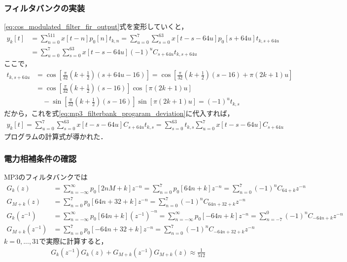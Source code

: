\documentclass[14pt,xcolor=dvipsnames,table,dvipdfmx]{beamer}
\begin{document}
\begin{frame}[c]
    \frametitle{フィルタバンクの実装}
    \scriptsize
    \eqref{eq:cos_modulated_filter_fir_output}式を変形していくと，
    \begin{align}
        y_{k}[t] &= \sum_{n = 0}^{511} x[t - n] p_{0}[n] t_{k, n} = \sum_{u = 0}^{7} \sum_{s = 0}^{63} x[t - s - 64u] p_{0}[s + 64u] t_{k,s+64u} \nonumber \\
        &= \sum_{u = 0}^{7} \sum_{s = 0}^{63} x[t - s - 64u] (-1)^{u} C_{s + 64u} t_{k,s+64u} \label{eq:mp3_filterbank_progaram_deviation}
    \end{align}
    ここで，
    \begin{align*}
        t_{k,s+64u} &= \cos\left[ \frac{\pi}{32} \left( k + \frac{1}{2} \right) (s + 64u - 16) \right] = \cos\left[ \frac{\pi}{32} \left( k + \frac{1}{2} \right) (s - 16) + \pi \left( 2k + 1 \right) u \right] \\
        &= \cos\left[ \frac{\pi}{32} \left( k + \frac{1}{2} \right) (s - 16) \right]\cos\left[ \pi(2k + 1)u \right] \\
        &\quad - \sin\left[ \frac{\pi}{32} \left( k + \frac{1}{2} \right) (s - 16) \right]\sin\left[ \pi(2k + 1)u \right]
        = (-1)^{u} t_{k,s}
    \end{align*}
    だから，これを式\eqref{eq:mp3_filterbank_progaram_deviation}に代入すれば，
    \begin{align*}
        y_{k}[t] = \sum_{u = 0}^{7} \sum_{s = 0}^{63} x[t - s - 64u] C_{s + 64u} t_{k,s} = \sum_{s = 0}^{63} t_{k,s} \sum_{u = 0}^{7} x[t - s - 64u] C_{s + 64u}
    \end{align*}
    プログラムの計算式が導かれた．
\end{frame}

\begin{frame}[c]
    \frametitle{電力相補条件の確認}
    MP3のフィルタバンクでは
    \scriptsize
    \begin{align*}
        G_{k}(z) &= \sum_{n = -\infty}^{\infty} p_{0}[2nM + k] z^{-n} = \sum_{n = 0}^{7} p_{0}[64n + k] z^{-n} = \sum_{n = 0}^{7} (-1)^{n} C_{64 + k} z^{-n} \\
        G_{M+k}(z) &= \sum_{n = 0}^{7} p_{0}[64n + 32 + k] z^{-n} = \sum_{n = 0}^{7} (-1)^{n} C_{64n + 32 + k} z^{-n} \\
        G_{k}(z^{-1}) &= \sum_{n = -\infty}^{\infty} p_{0}[64n + k] (z^{-1})^{-n} = \sum_{n = -\infty}^{\infty} p_{0}[-64n + k] z^{-n} = \sum_{n = -7}^{0} (-1)^{n} C_{-64n + k} z^{-n} \\
        G_{M+k}(z^{-1}) &= \sum_{n = 0}^{7} p_{0}[-64n + 32 + k] z^{-n} = \sum_{n = 0}^{7} (-1)^{n} C_{-64n + 32 + k} z^{-n}
    \end{align*}
    \normalsize
    $k = 0, ..., 31$で実際に計算すると，
    \begin{align*}
        G_{k}(z^{-1})G_{k}(z) + G_{M+k}(z^{-1})G_{M+k}(z) \approx \frac{1}{512}
    \end{align*}
\end{frame}
\end{document}
